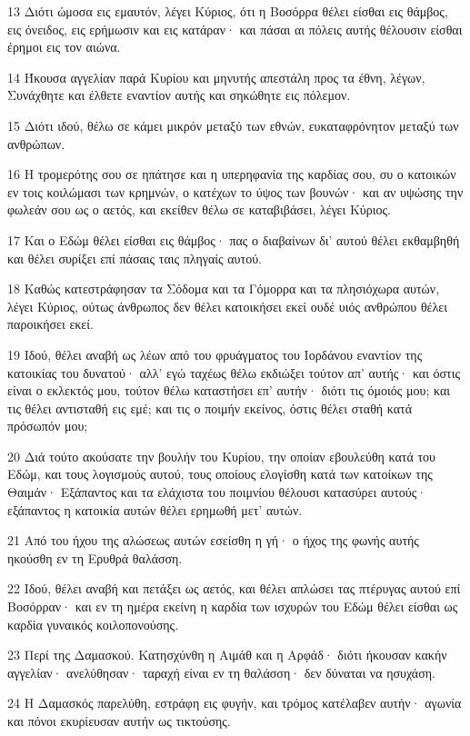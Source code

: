 \par 13 Διότι ώμοσα εις εμαυτόν, λέγει Κύριος, ότι η Βοσόρρα θέλει είσθαι εις θάμβος, εις όνειδος, εις ερήμωσιν και εις κατάραν· και πάσαι αι πόλεις αυτής θέλουσιν είσθαι έρημοι εις τον αιώνα.
\par 14 Ήκουσα αγγελίαν παρά Κυρίου και μηνυτής απεστάλη προς τα έθνη, λέγων, Συνάχθητε και έλθετε εναντίον αυτής και σηκώθητε εις πόλεμον.
\par 15 Διότι ιδού, θέλω σε κάμει μικρόν μεταξύ των εθνών, ευκαταφρόνητον μεταξύ των ανθρώπων.
\par 16 Η τρομερότης σου σε ηπάτησε και η υπερηφανία της καρδίας σου, συ ο κατοικών εν τοις κοιλώμασι των κρημνών, ο κατέχων το ύψος των βουνών· και αν υψώσης την φωλεάν σου ως ο αετός, και εκείθεν θέλω σε καταβιβάσει, λέγει Κύριος.
\par 17 Και ο Εδώμ θέλει είσθαι εις θάμβος· πας ο διαβαίνων δι' αυτού θέλει εκθαμβηθή και θέλει συρίξει επί πάσαις ταις πληγαίς αυτού.
\par 18 Καθώς κατεστράφησαν τα Σόδομα και τα Γόμορρα και τα πλησιόχωρα αυτών, λέγει Κύριος, ούτως άνθρωπος δεν θέλει κατοικήσει εκεί ουδέ υιός ανθρώπου θέλει παροικήσει εκεί.
\par 19 Ιδού, θέλει αναβή ως λέων από του φρυάγματος του Ιορδάνου εναντίον της κατοικίας του δυνατού· αλλ' εγώ ταχέως θέλω εκδιώξει τούτον απ' αυτής· και όστις είναι ο εκλεκτός μου, τούτον θέλω καταστήσει επ' αυτήν· διότι τις όμοιός μου; και τις θέλει αντισταθή εις εμέ; και τις ο ποιμήν εκείνος, όστις θέλει σταθή κατά πρόσωπόν μου;
\par 20 Διά τούτο ακούσατε την βουλήν του Κυρίου, την οποίαν εβουλεύθη κατά του Εδώμ, και τους λογισμούς αυτού, τους οποίους ελογίσθη κατά των κατοίκων της Θαιμάν· Εξάπαντος και τα ελάχιστα του ποιμνίου θέλουσι κατασύρει αυτούς· εξάπαντος η κατοικία αυτών θέλει ερημωθή μετ' αυτών.
\par 21 Από του ήχου της αλώσεως αυτών εσείσθη η γή· ο ήχος της φωνής αυτής ηκούσθη εν τη Ερυθρά θαλάσση.
\par 22 Ιδού, θέλει αναβή και πετάξει ως αετός, και θέλει απλώσει τας πτέρυγας αυτού επί Βοσόρραν· και εν τη ημέρα εκείνη η καρδία των ισχυρών του Εδώμ θέλει είσθαι ως καρδία γυναικός κοιλοπονούσης.
\par 23 Περί της Δαμασκού. Κατησχύνθη η Αιμάθ και η Αρφάδ· διότι ήκουσαν κακήν αγγελίαν· ανελύθησαν· ταραχή είναι εν τη θαλάσση· δεν δύναται να ησυχάση.
\par 24 Η Δαμασκός παρελύθη, εστράφη εις φυγήν, και τρόμος κατέλαβεν αυτήν· αγωνία και πόνοι εκυρίευσαν αυτήν ως τικτούσης.

